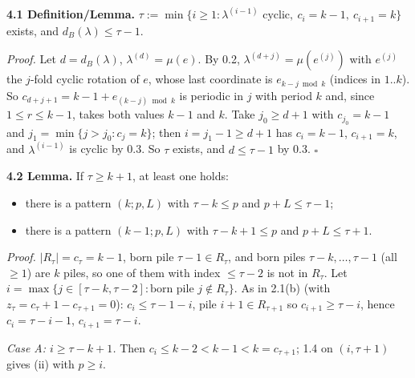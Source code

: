 \documentclass[11pt]{article}
\begin{document}
\textbf{4.1 Definition/Lemma.} $\tau:=\min\{i\ge1:\lambda^{(i-1)}\text{ cyclic},\ c_i=k-1,\ c_{i+1}=k\}$ exists, and $d_B(\lambda)\le\tau-1$.

\emph{Proof.} Let $d=d_B(\lambda)$, $\lambda^{(d)}=\mu(e)$. By 0.2, $\lambda^{(d+j)}=\mu(e^{(j)})$ with $e^{(j)}$ the $j$-fold cyclic rotation of $e$, whose last coordinate is $e_{k-j\bmod k}$ (indices in $1..k$). So $c_{d+j+1}=k-1+e_{(k-j)\bmod k}$ is periodic in $j$ with period $k$ and, since $1\le r\le k-1$, takes both values $k-1$ and $k$. Take $j_0\ge d+1$ with $c_{j_0}=k-1$ and $j_1=\min\{j>j_0:c_j=k\}$; then $i=j_1-1\ge d+1$ has $c_i=k-1$, $c_{i+1}=k$, and $\lambda^{(i-1)}$ is cyclic by 0.3. So $\tau$ exists, and $d\le\tau-1$ by 0.3. $\square$

\textbf{4.2 Lemma.} If $\tau\ge k+1$, at least one holds:
\begin{itemize}
\item[(i)] there is a pattern $(k;p,L)$ with $\tau-k\le p$ and $p+L\le\tau-1$;
\item[(ii)] there is a pattern $(k-1;p,L)$ with $\tau-k+1\le p$ and $p+L\le\tau+1$.
\end{itemize}

\emph{Proof.} $|R_\tau|=c_\tau=k-1$, born pile $\tau-1\in R_\tau$, and born piles $\tau-k,\dots,\tau-1$ (all $\ge1$) are $k$ piles, so one of them with index $\le\tau-2$ is not in $R_\tau$. Let $i=\max\{j\in[\tau-k,\tau-2]:\text{born pile }j\notin R_\tau\}$. As in 2.1(b) (with $z_\tau=c_\tau+1-c_{\tau+1}=0$): $c_i\le\tau-1-i$, pile $i+1\in R_{\tau+1}$ so $c_{i+1}\ge\tau-i$, hence $c_i=\tau-i-1$, $c_{i+1}=\tau-i$.

\emph{Case A: $i\ge\tau-k+1$.} Then $c_i\le k-2<k-1<k=c_{\tau+1}$; 1.4 on $(i,\tau+1)$ gives (ii) with $p\ge i$.
\end{document}
